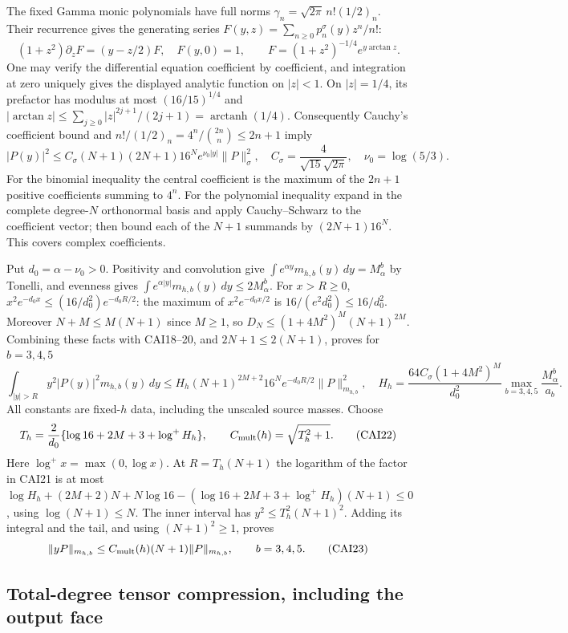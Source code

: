 The fixed Gamma monic polynomials have full norms
$\gamma_n=\sqrt{2\pi}\,n!(1/2)_n$. Their recurrence gives the
generating series $F(y,z)=\sum_{n\ge0}p_n^\sigma(y)z^n/n!$:
\[
 (1+z^2)\partial_zF=(y-z/2)F,\quad F(y,0)=1,\qquad
 F=(1+z^2)^{-1/4}e^{y\arctan z}.\tag{CAI19}
\]
One may verify the differential equation coefficient by coefficient,
and integration at zero uniquely gives the displayed analytic function
on $|z|<1$. On $|z|=1/4$, its prefactor has modulus at most
$(16/15)^{1/4}$ and
$|\arctan z|\le\sum_{j\ge0}|z|^{2j+1}/(2j+1)=\operatorname{arctanh}(1/4)$.
Consequently Cauchy's coefficient bound and
$n!/(1/2)_n=4^n/\binom{2n}{n}\le2n+1$ imply
\[
 |P(y)|^2\le C_\sigma(N+1)(2N+1)16^N e^{\nu_0|y|}\|P\|_\sigma^2,
 \quad C_\sigma=\frac4{\sqrt{15}\sqrt{2\pi}},\quad
 \nu_0=\log(5/3).\tag{CAI20}
\]
For the binomial inequality the central coefficient is the maximum of
the $2n+1$ positive coefficients summing to $4^n$. For the polynomial
inequality expand in the complete degree-$N$ orthonormal basis and
apply Cauchy--Schwarz to the coefficient vector; then bound each of
the $N+1$ summands by $(2N+1)16^N$. This covers complex coefficients.

Put $d_0=\alpha-\nu_0>0$. Positivity and convolution give
$\int e^{\alpha y}m_{h,b}(y)\,dy=M_\alpha^b$ by Tonelli, and evenness
gives $\int e^{\alpha|y|}m_{h,b}(y)\,dy\le2M_\alpha^b$.
For $x>R\ge0$,
$x^2e^{-d_0x}\le(16/d_0^2)e^{-d_0R/2}$: the maximum of
$x^2e^{-d_0x/2}$ is $16/(e^2d_0^2)\le16/d_0^2$.
Moreover $N+M\le M(N+1)$ since $M\ge1$, so
$D_N\le(1+4M^2)^M(N+1)^{2M}$. Combining these facts with CAI18--20,
and $2N+1\le2(N+1)$, proves for $b=3,4,5$
\[
 \int_{|y|>R}y^2|P(y)|^2m_{h,b}(y)\,dy
 \le H_h(N+1)^{2M+2}16^Ne^{-d_0R/2}\|P\|_{m_{h,b}}^2,
 \quad H_h=\frac{64C_\sigma(1+4M^2)^M}{d_0^2}
                          \max_{b=3,4,5}\frac{M_\alpha^b}{a_b}.
 \tag{CAI21}
\]
All constants are fixed-$h$ data, including the unscaled source masses.
Choose
\[
 T_h=\frac2{d_0}\{\log16+2M+3+\log^+H_h\},\qquad
 C_{\rm mult}(h)=\sqrt{T_h^2+1}.\tag{CAI22}
\]
Here $\log^+x=\max(0,\log x)$. At $R=T_h(N+1)$ the logarithm of the
factor in CAI21 is at most
$\log H_h+(2M+2)N+N\log16-
(\log16+2M+3+\log^+H_h)(N+1)\le0$, using
$\log(N+1)\le N$. The inner interval has $y^2\le T_h^2(N+1)^2$.
Adding its integral and the tail, and using $(N+1)^2\ge1$, proves
\[
 \|yP\|_{m_{h,b}}\le C_{\rm mult}(h)(N+1)\|P\|_{m_{h,b}},
                         \qquad b=3,4,5.\tag{CAI23}
\]

\subsection{Total-degree tensor compression, including the output face}

